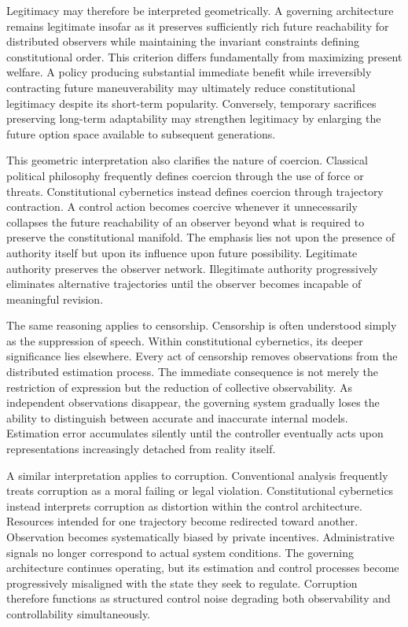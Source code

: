 \documentclass[12pt,a4paper]{article}
\begin{document}
Legitimacy may therefore be interpreted geometrically. A governing architecture remains legitimate insofar as it preserves sufficiently rich future reachability for distributed observers while maintaining the invariant constraints defining constitutional order. This criterion differs fundamentally from maximizing present welfare. A policy producing substantial immediate benefit while irreversibly contracting future maneuverability may ultimately reduce constitutional legitimacy despite its short-term popularity. Conversely, temporary sacrifices preserving long-term adaptability may strengthen legitimacy by enlarging the future option space available to subsequent generations.

This geometric interpretation also clarifies the nature of coercion. Classical political philosophy frequently defines coercion through the use of force or threats. Constitutional cybernetics instead defines coercion through trajectory contraction. A control action becomes coercive whenever it unnecessarily collapses the future reachability of an observer beyond what is required to preserve the constitutional manifold. The emphasis lies not upon the presence of authority itself but upon its influence upon future possibility. Legitimate authority preserves the observer network. Illegitimate authority progressively eliminates alternative trajectories until the observer becomes incapable of meaningful revision.

The same reasoning applies to censorship. Censorship is often understood simply as the suppression of speech. Within constitutional cybernetics, its deeper significance lies elsewhere. Every act of censorship removes observations from the distributed estimation process. The immediate consequence is not merely the restriction of expression but the reduction of collective observability. As independent observations disappear, the governing system gradually loses the ability to distinguish between accurate and inaccurate internal models. Estimation error accumulates silently until the controller eventually acts upon representations increasingly detached from reality itself.

A similar interpretation applies to corruption. Conventional analysis frequently treats corruption as a moral failing or legal violation. Constitutional cybernetics instead interprets corruption as distortion within the control architecture. Resources intended for one trajectory become redirected toward another. Observation becomes systematically biased by private incentives. Administrative signals no longer correspond to actual system conditions. The governing architecture continues operating, but its estimation and control processes become progressively misaligned with the state they seek to regulate. Corruption therefore functions as structured control noise degrading both observability and controllability simultaneously.
\end{document}
